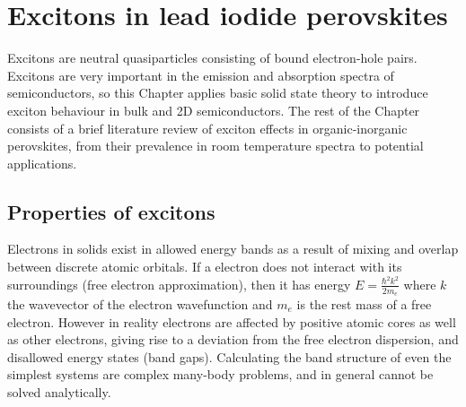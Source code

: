 
\chapter{Excitons in lead iodide perovskites}

\graphicspath{{Chapter2/Figures/}}

Excitons are neutral quasiparticles consisting of bound electron-hole pairs. Excitons are very important in the emission and absorption spectra of semiconductors, so this Chapter applies basic solid state theory to introduce exciton behaviour in bulk and 2D semiconductors. The rest of the Chapter consists of a brief literature review of exciton effects in organic-inorganic perovskites, from their prevalence in room temperature spectra to potential applications.

\section{Properties of excitons}
Electrons in solids exist in allowed energy bands as a result of mixing and overlap between discrete atomic orbitals. If a electron does not interact with its surroundings (free electron approximation), then it has energy $E=\frac{\hbar^2k^2}{2m_e}$ where $k$ the wavevector of the electron wavefunction and $m_e$ is the rest mass of a free electron. However in reality electrons are affected by positive atomic cores as well as other electrons, giving rise to a deviation from the free electron dispersion, and disallowed energy states (band gaps). Calculating the band structure of even the simplest systems are complex many-body problems, and in general cannot be solved analytically.

